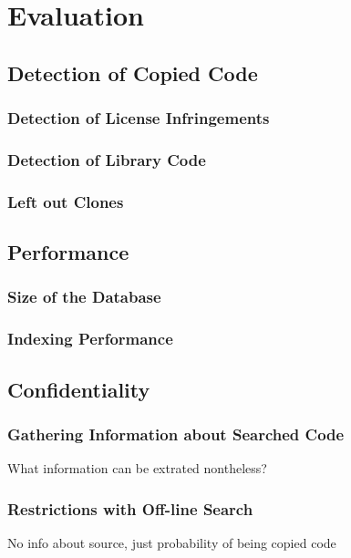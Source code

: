 
\chapter{Evaluation}\label{chapter:evaluation}
\section{Detection of Copied Code} %
\subsection{Detection of License Infringements} %
\subsection{Detection of Library Code}
\subsection{Left out Clones}

\section{Performance}
\subsection{Size of the Database}
\subsection{Indexing Performance}

\section{Confidentiality}
\subsection{Gathering Information about Searched Code}
What information can be extrated nontheless?
\subsection{Restrictions with Off-line Search}
No info about source, just probability of being copied code